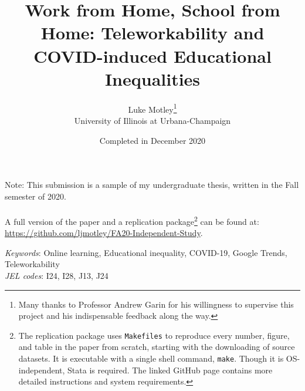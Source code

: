 \documentclass[11pt]{article}
\title{Work from Home, School from Home: Teleworkability and COVID-induced Educational Inequalities}
\author{Luke Motley\thanks{Many thanks to Professor Andrew Garin for his willingness to supervise this project and his indispensable feedback along the way.} \\ University of Illinois at Urbana-Champaign}
\date{Completed in December 2020}
\begin{document}
\begin{titlepage}
\maketitle

\vspace{1.5cm}
{\Large
 Note: This submission is a sample of my undergraduate thesis, written in the Fall semester of 2020.
\\ \\
A full version of the paper and a replication package\footnote{The replication package uses \texttt{Makefiles} to reproduce every number, figure, and table in the paper from scratch, starting with the downloading of source datasets. It is executable with a single shell command, \texttt{make}. Though it is OS-independent, Stata is required. The linked GitHub page contains more detailed instructions and system requirements.} can be found at: \\
\href{https://github.com/ljmotley/FA20-Independent-Study}{https://github.com/ljmotley/FA20-Independent-Study}.
}

\end{titlepage}



\begin{abstract}

\end{abstract}
\vspace{1cm}
{\small
\noindent \textit{Keywords}:
Online learning,
Educational inequality,
COVID-19,
Google Trends,
Teleworkability
\\
\textit{JEL codes}:
I24,
I28,
J13,
J24
}
\thispagestyle{empty}
\newpage
\setcounter{page}{1}


\if{}
\doublespacing
\fi










\end{document}
